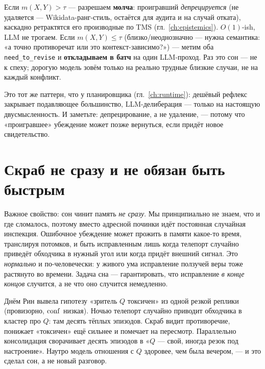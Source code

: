 \begin{principle}
Если $m(X,Y)>\tau$ — разрешаем \textbf{молча}: проигравший \emph{депрецируется}
(не удаляется — Wikidata-ранг-стиль, остаётся для аудита и на случай отката),
каскадно ретрактятся его производные по TMS (гл.~\ref{ch:epistemics}). $O(1)$-ish,
LLM не трогаем. Если $m(X,Y)\le\tau$ (близко/неоднозначно — нужна семантика: «а точно
противоречат или это контекст-зависимо?») — метим оба \texttt{need\_to\_revise} и
\textbf{откладываем в батч} на один LLM-проход. Раз это сон — не к спеху; дорогую
модель зовём только на реально трудные близкие случаи, не на каждый конфликт.
\end{principle}

Это тот же паттерн, что у планировщика (гл.~\ref{ch:runtime}): дешёвый рефлекс
закрывает подавляющее большинство, LLM-делиберация — только на настоящую
двусмысленность. И заметьте: депрецирование, а не удаление, — потому что «проигравшее»
убеждение может позже вернуться, если придёт новое свидетельство.

\section{Скраб не сразу и не обязан быть быстрым}

Важное свойство: сон чинит память \emph{не сразу}. Мы принципиально не знаем, что и
где сломалось, поэтому вместо адресной починки идёт постоянная случайная инспекция.
Ошибочное убеждение может прожить в памяти какое-то время, транслируя потомков, и
быть исправленным лишь когда телепорт случайно приведёт обходчика в нужный угол или
когда придёт внешний сигнал. Это \emph{нормально} и по-человечески: у живого ума
исправление ползучей веры тоже растянуто во времени. Задача сна — гарантировать, что
исправление \emph{в конце концов} случится, а не что оно случится немедленно.

\begin{workedbox}
Днём Рин вывела гипотезу «зритель $Q$ токсичен» из одной резкой реплики (провизорно,
$\mathrm{conf}$ низкая). Ночью телепорт случайно приводит обходчика в кластер про $Q$:
там десять тёплых эпизодов. Скраб видит противоречие, понижает «токсичен» ещё
сильнее и помечает на пересмотр. Параллельно консолидация сворачивает десять
эпизодов в «$Q$ — свой, иногда резок под настроение». Наутро модель отношения с $Q$
здоровее, чем была вечером, — и это сделал сон, а не новый разговор.
\end{workedbox}

